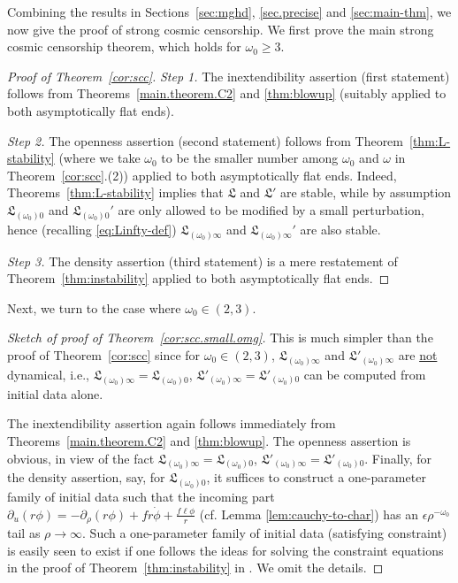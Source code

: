 \documentclass[10pt, reqno]{amsart}
\theoremstyle{definition}
\theoremstyle{remark}
\numberwithin{equation}{section}
\newcommand{\rd}{\partial}
\newcommand{\0}{\emptyset}
\newcommand{\eps}{\epsilon}
\newcommand{\omg}{\omega}
\newcommand{\pfstep}[1]{\vspace{.5em} {\it \noindent #1.}}
\begin{document}
Combining the results in Sections~\ref{sec:mghd}, \ref{sec.precise} and \ref{sec:main-thm}, we now give the proof of strong cosmic censorship. We first prove the main strong cosmic censorship theorem, which holds for $\omg_0\geq 3$.

\begin{proof}[Proof of Theorem~\ref{cor:scc}]
\pfstep{Step 1} The inextendibility assertion (first statement) follows from Theorems~\ref{main.theorem.C2} and \ref{thm:blowup} (suitably applied to both asymptotically flat ends).

\pfstep{Step 2} The openness assertion (second statement) follows from Theorem~\ref{thm:L-stability} (where we take $\omg_{0}$ to be the smaller number among $\omg_{0}$ and $\omg$ in Theorem~\ref{cor:scc}.(2)) applied to both asymptotically flat ends. Indeed, Theorems~\ref{thm:L-stability} implies that $\mathfrak L$ and $\mathfrak L'$ are stable, while by assumption $\mathfrak L_{(\omg_0) 0}$ and $\mathfrak L_{(\omg_0)0}'$ are only allowed to be modified by a small perturbation, hence (recalling \eqref{eq:Linfty-def}) $\mathfrak L_{(\omg_0) \infty}$ and $\mathfrak L_{(\omg_0)\infty}'$ are also stable.

\pfstep{Step 3} The density assertion (third statement) is a mere restatement of Theorem~\ref{thm:instability} applied to both asymptotically flat ends.
\end{proof}

Next, we turn to the case where $\omg_0\in (2,3)$.
\begin{proof}[Sketch of proof of Theorem~\ref{cor:scc.small.omg}]
This is much simpler than the proof of Theorem~\ref{cor:scc} since for $\omg_0\in (2,3)$, $\mathfrak L_{(\omg_0)\infty}$ and $\mathfrak L'_{(\omg_0)\infty}$ are \underline{not} dynamical, i.e., $\mathfrak L_{(\omg_0)\infty}=\mathfrak L_{(\omg_0)0}$, $\mathfrak L'_{(\omg_0)\infty}=\mathfrak L'_{(\omg_0)0}$ can be computed from initial data alone.

The inextendibility assertion again follows immediately from Theorems~\ref{main.theorem.C2} and \ref{thm:blowup}. The openness assertion is obvious, in view of the fact $\mathfrak L_{(\omg_0)\infty}=\mathfrak L_{(\omg_0)0}$, $\mathfrak L'_{(\omg_0)\infty}=\mathfrak L'_{(\omg_0)0}$. Finally, for the density assertion, say, for $\mathfrak L_{(\omg_0)0}$, it suffices to construct a one-parameter family of initial data such that the incoming part $\rd_u(r\phi)=-\rd_\rho(r\phi) + f r \dot{\phi} + \frac{f \ell \phi}{r}$ (cf. Lemma \ref{lem:cauchy-to-char}) has an $\eps \rho^{-\omg_0}$ tail as $\rho\to \infty$. Such a one-parameter family of initial data (satisfying constraint) is easily seen to exist if one follows the ideas for solving the constraint equations in the proof of Theorem~\ref{thm:instability} in \cite{LO.exterior}. We omit the details.
\end{proof}
\end{document}
